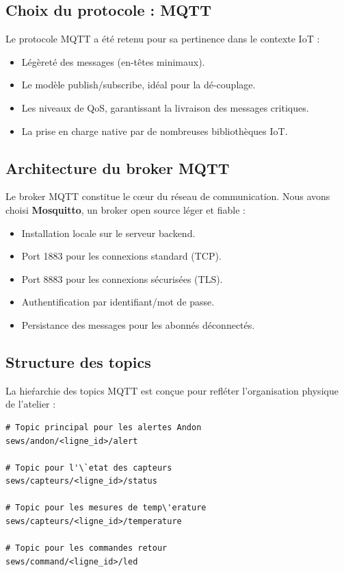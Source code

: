 \subsection{Choix du protocole : MQTT}

Le protocole MQTT a \'et\'e retenu pour sa pertinence dans le contexte IoT :

\begin{itemize}
    \item L\'eg\`eret\'e des messages (en-t\^etes minimaux).
    \item Le mod\`ele publish/subscribe, id\'eal pour la d\'e-couplage.
    \item Les niveaux de QoS, garantissant la livraison des messages critiques.
    \item La prise en charge native par de nombreuses biblioth\`eques IoT.
\end{itemize}

\subsection{Architecture du broker MQTT}

Le broker MQTT constitue le c\oe{}ur du r\'eseau de communication. Nous avons choisi \textbf{Mosquitto}, un broker open source l\'eger et fiable :

\begin{itemize}
    \item Installation locale sur le serveur backend.
    \item Port 1883 pour les connexions standard (TCP).
    \item Port 8883 pour les connexions s\'ecuris\'ees (TLS).
    \item Authentification par identifiant/mot de passe.
    \item Persistance des messages pour les abonn\'es d\'econnect\'es.
\end{itemize}

\subsection{Structure des topics}

La hie\'rarchie des topics MQTT est con\c{c}ue pour refl\'eter l'organisation physique de l'atelier :

\begin{lstlisting}[caption={Hi\'erarchie des topics MQTT},label={lst:topics_structure}]
# Topic principal pour les alertes Andon
sews/andon/<ligne_id>/alert

# Topic pour l'\`etat des capteurs
sews/capteurs/<ligne_id>/status

# Topic pour les mesures de temp\'erature
sews/capteurs/<ligne_id>/temperature

# Topic pour les commandes retour
sews/command/<ligne_id>/led
\end{lstlisting}

